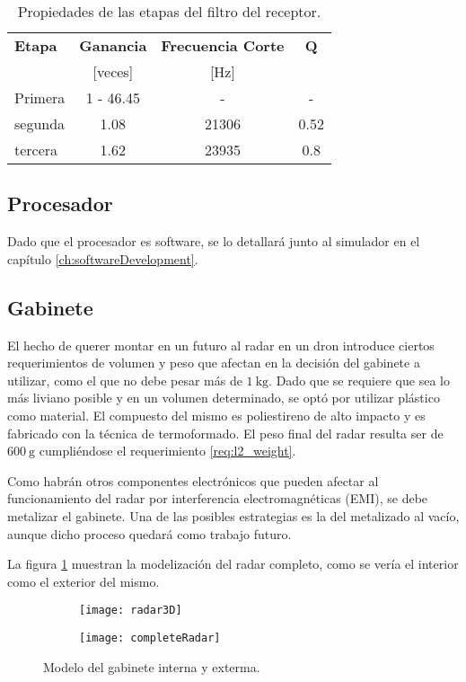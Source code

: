 \begin{table}[htb]
  \caption{Propiedades de las etapas del filtro del receptor.}
  \centering
  \label{tab:lowPassProperties}
  \begin{tabular}{l c c c}
  \toprule
  \textbf{Etapa} & \textbf{Ganancia} & \textbf{Frecuencia Corte} & \textbf{Q} \tabularnewline
   & [veces] & [Hz] & \tabularnewline
  \midrule
  Primera & 1 - 46.45 & - & - \tabularnewline

  segunda & 1.08 & 21306 & 0.52 \tabularnewline

  tercera & 1.62 & 23935 & 0.8 \tabularnewline

  \bottomrule
  \end{tabular}
\end{table}

\subsection{Procesador}

Dado que el procesador es software, se lo detallará junto al simulador en el capítulo \ref{ch:softwareDevelopment}.

\subsection{Gabinete}

El hecho de querer montar en un futuro al radar en un dron introduce ciertos requerimientos de volumen y peso que afectan en la decisión del gabinete a utilizar, como el que no debe pesar más de $\SI{1}{\kg}$. Dado que se requiere que sea lo más liviano posible y en un volumen determinado, se optó por utilizar plástico como material. El compuesto del mismo es poliestireno de alto impacto y es fabricado con la técnica de termoformado. El peso final del radar resulta ser de $\SI{600}{\gram}$ cumpliéndose el requerimiento \ref{req:l2_weight}.

Como habrán otros componentes electrónicos que pueden afectar al funcionamiento del radar por interferencia electromagnéticas (EMI), se debe metalizar el gabinete. Una de las posibles estrategias es la del metalizado al vacío, aunque dicho proceso quedará como trabajo futuro.

La figura \ref{fig:radar3D} muestran la modelización del radar completo, como se vería el interior como el exterior del mismo.
\begin{figure}[H]
 \centering
 \begin{subfigure}[t]{0.49\textwidth}
    \texttt{[image: radar3D]}
  \end{subfigure}
  \begin{subfigure}[t]{0.49\textwidth}
    \texttt{[image: completeRadar]}
  \end{subfigure}
 \caption{Modelo del gabinete interna y exterma.}
 \label{fig:radar3D}
\end{figure}

